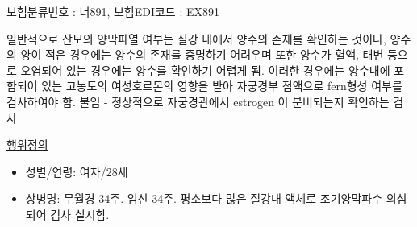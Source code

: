 \prezi{\clearpage}

\prezi{\clearpage}
\par
보험분류번호 : 너891, 보험EDI코드 : EX891
\begin{description}\tightlist
\item[적응증] 일반적으로 산모의 양막파열 여부는 질강 내에서 양수의 존재를 확인하는 것이나, 양수의 양이 적은 경우에는 양수의 존재를 증명하기 어려우며 또한 양수가 혈액, 태변 등으로 오염되어 있는 경우에는 양수를 확인하기 어렵게 됨. 이러한 경우에는 양수내에 포함되어 있는 고농도의 여성호르몬의 영향을 받아 자궁경부 점액으로 fern형성 여부를 검사하여야 함. 불임 - 정상적으로 자궁경관에서 estrogen 이 분비되는지 확인하는 검사
\item[실시방법] \href{http://www.hira.or.kr/rd/reval/revalueActDefView.do?pgmid=HIRAA030075000000}{행위정의}
\item[전형적 사례]
	\begin{itemize}\tightlist
	\item 성별/연령: 여자/28세
	\item 상병명: 무월경 34주. 임신 34주. 평소보다 많은 질강내 액체로 조기양막파수 의심되어 검사 실시함.
	\end{itemize}
\end{description}
